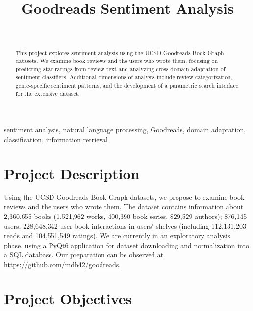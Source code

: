 \documentclass[journal,12pt,onecolumn,draftcls]{IEEEtran}
\begin{document}
\title{Goodreads Sentiment Analysis}
\author{ \\
}
\maketitle
\begin{abstract}
This project explores sentiment analysis using the UCSD Goodreads Book Graph datasets. We examine book reviews and the users who wrote them, focusing on predicting star ratings from review text and analyzing cross-domain adaptation of sentiment classifiers. Additional dimensions of analysis include review categorization, genre-specific sentiment patterns, and the development of a parametric search interface for the extensive dataset.
\end{abstract}

\begin{IEEEkeywords}
sentiment analysis, natural language processing, Goodreads, domain adaptation, classification, information retrieval
\end{IEEEkeywords}

\section{Project Description}
\label{sec:description}

Using the UCSD Goodreads Book Graph datasets, we propose to examine book reviews and the users who wrote them. The dataset contains information about 2,360,655 books (1,521,962 works, 400,390 book series, 829,529 authors); 876,145 users; 228,648,342 user-book interactions in users' shelves (including 112,131,203 reads and 104,551,549 ratings). We are currently in an exploratory analysis phase, using a PyQt6 application for dataset downloading and normalization into a SQL database. Our preparation can be observed at \href{https://github.com/mdb42/goodreads}{https://github.com/mdb42/goodreads}.

\section{Project Objectives}
\label{sec:objectives}
\end{document}
